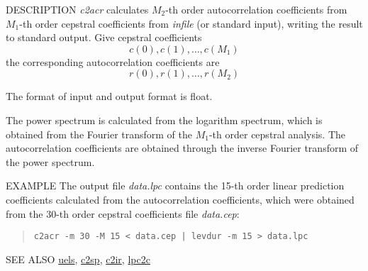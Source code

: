 \begin{synopsis}
\item[c2acr] [ --m $M_1$ ] [ --M $M_2$ ] [ --l $L$ ] [ {\em infile} ]
\end{synopsis}

\begin{qsection}{DESCRIPTION}
{\em c2acr} calculates $M_2$-th order autocorrelation coefficients 
from $M_1$-th order cepstral coefficients from {\em infile} (or standard input),
 writing the result to standard output.
Give cepstral coefficients
\begin{displaymath}
c(0), c(1), \ldots, c(M_1)
\end{displaymath}
the corresponding autocorrelation coefficients are
\begin{displaymath}
r(0), r(1), \ldots, r(M_2)
\end{displaymath}

The format of input and output format is float.

The power spectrum is calculated from the logarithm spectrum,
which is obtained from the Fourier transform of the $M_1$-th
order cepstral analysis.
The autocorrelation coefficients are obtained through the inverse
Fourier transform of the power spectrum.
\end{qsection}

\begin{options}
\end{options}

\begin{qsection}{EXAMPLE}
The output file {\em data.lpc} contains the 15-th order linear prediction
coefficients calculated from the autocorrelation coefficients,
which were obtained from the 30-th order cepstral coefficients
file {\em data.cep}:
\begin{quote}
  \verb!c2acr -m 30 -M 15 < data.cep | levdur -m 15 > data.lpc!
\end{quote}
\end{qsection}

\begin{qsection}{SEE ALSO}
\hyperlink{uels}{uels},
\hyperlink{c2sp}{c2sp},
\hyperlink{c2ir}{c2ir},
\hyperlink{lpc2c}{lpc2c}
\end{qsection}
